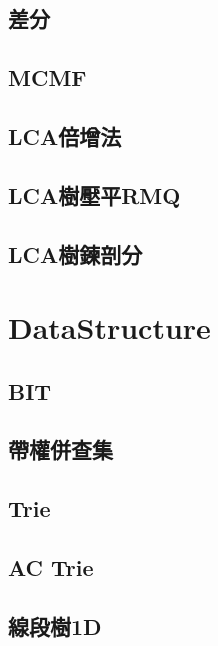     \subsection{差分}
         \columnbreak
    \subsection{MCMF}
         \columnbreak
    \subsection{LCA倍增法}
         \columnbreak
    \subsection{LCA樹壓平RMQ}
        
    \subsection{LCA樹鍊剖分}
        
\clearpage

\section{DataStructure}
    \subsection{BIT}
        
    \subsection{帶權併查集}
         \columnbreak
    \subsection{Trie}
         \columnbreak
    \subsection{AC Trie}
         \columnbreak
    \subsection{線段樹1D}
         \columnbreak

